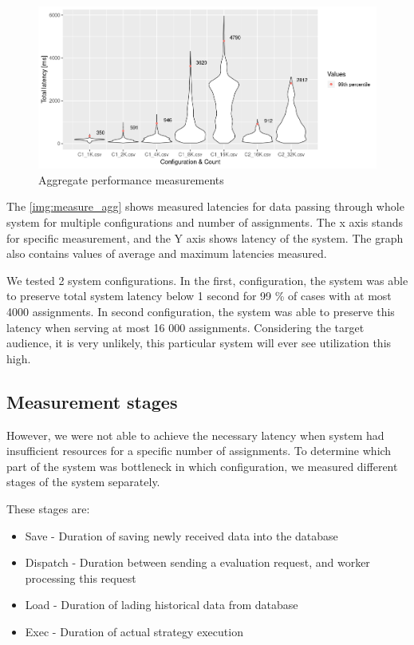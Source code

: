 \begin{figure}[H]
    \includegraphics[width=\textwidth]{obrazky-figures/agg.png}
    \caption{Aggregate performance measurements}
    \label{img:measure_agg}
\end{figure}

The \autoref{img:measure_agg} shows measured latencies for data passing through whole system for multiple configurations and
number of assignments. The x axis stands for specific measurement, and the Y axis shows latency of the system. The graph
also contains values of average and maximum latencies measured.


We tested 2 system configurations. In the first, configuration, the system was able to preserve total system latency below
1 second for 99 \% of cases with at most 4000 assignments. In second configuration, the system was able to preserve this latency
when serving at most 16 000 assignments. Considering the target audience, it is very unlikely, this particular system
will ever see utilization this high.


\subsection{Measurement stages}
However, we were not able to achieve the necessary latency when system had insufficient resources
for a specific number of assignments. To determine which part of the system
was bottleneck in which configuration, we measured different stages of the system separately.

These stages are:
\begin{itemize}
    \item{Save} - Duration of saving newly received data into the database
    \item{Dispatch} - Duration between sending a evaluation request, and worker processing this request
    \item{Load} - Duration of lading historical data from database
    \item{Exec} - Duration of actual strategy execution
\end{itemize}


